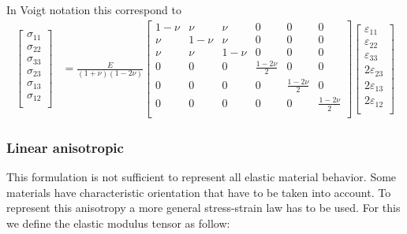 In Voigt notation this correspond to
\begin{align}
  \left[\begin{array}{c}
      \sigma_{11}\\
      \sigma_{22}\\
      \sigma_{33}\\
      \sigma_{23}\\
      \sigma_{13}\\
      \sigma_{12}\\
    \end{array}\right]
  &= \frac{E}{(1+\nu)(1-2\nu)}\left[
    \begin{array}{cccccc}
      1-\nu & \nu   & \nu   & 0 & 0 & 0\\
      \nu   & 1-\nu & \nu   & 0 & 0 & 0\\
      \nu   & \nu   & 1-\nu & 0 & 0 & 0\\
      0     &  0    &  0    & \frac{1-2\nu}{2} & 0 & 0 \\
      0     &  0    &  0    & 0 & \frac{1-2\nu}{2} & 0 \\
      0     &  0    &  0    & 0 & 0 & \frac{1-2\nu}{2} \\
    \end{array}\right]
  \left[\begin{array}{c}
      \varepsilon_{11}\\
      \varepsilon_{22}\\
      \varepsilon_{33}\\
      2\varepsilon_{23}\\
      2\varepsilon_{13}\\
      2\varepsilon_{12}\\
    \end{array}\right]
\end{align}

\subsubsection{Linear anisotropic}
This formulation is not sufficient to represent all elastic material
behavior. Some materials have characteristic orientation that have to be taken
into account. To represent this anisotropy a more general stress-strain law has
to be used. For this we define the elastic modulus tensor as follow:

